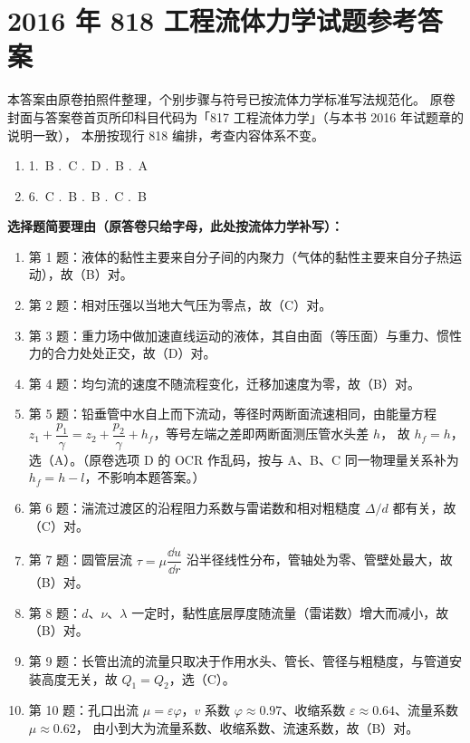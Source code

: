 \chapter{2016 年 818 工程流体力学试题参考答案}

\begin{tishi}
本答案由原卷拍照件整理，个别步骤与符号已按流体力学标准写法规范化。
原卷封面与答案卷首页所印科目代码为「817 工程流体力学」（与本书 2016 年试题章的说明一致），
本册按现行 818 编排，考查内容体系不变。
\end{tishi}


\begin{enumerate}[label={}]
  \item 1.~B .~C .~D .~B .~A
  \item 6.~C .~B .~B .~C .~B
\end{enumerate}

\begin{tishi}
\textbf{选择题简要理由（原答卷只给字母，此处按流体力学补写）：}
\begin{enumerate}
  \item 第 1 题：液体的黏性主要来自分子间的内聚力（气体的黏性主要来自分子热运动），故（B）对。
  \item 第 2 题：相对压强以当地大气压为零点，故（C）对。
  \item 第 3 题：重力场中做加速直线运动的液体，其自由面（等压面）与重力、惯性力的合力处处正交，故（D）对。
  \item 第 4 题：均匀流的速度不随流程变化，迁移加速度为零，故（B）对。
  \item 第 5 题：铅垂管中水自上而下流动，等径时两断面流速相同，由能量方程
    $z_1+\dfrac{p_1}{\gamma}=z_2+\dfrac{p_2}{\gamma}+h_f$，等号左端之差即两断面测压管水头差 $h$，
    故 $h_f=h$，选（A）。（原卷选项 D 的 OCR 作乱码，按与 A、B、C 同一物理量关系补为 $h_f=h-l$，不影响本题答案。）
  \item 第 6 题：湍流过渡区的沿程阻力系数与雷诺数和相对粗糙度 $\Delta/d$ 都有关，故（C）对。
  \item 第 7 题：圆管层流 $\tau=\mu\dfrac{\dd u}{\dd r}$ 沿半径线性分布，管轴处为零、管壁处最大，故（B）对。
  \item 第 8 题：$d$、$\nu$、$\lambda$ 一定时，黏性底层厚度随流量（雷诺数）增大而减小，故（B）对。
  \item 第 9 题：长管出流的流量只取决于作用水头、管长、管径与粗糙度，与管道安装高度无关，故 $Q_1=Q_2$，选（C）。
  \item 第 10 题：孔口出流 $\mu=\varepsilon\varphi$，$v$ 系数 $\varphi\approx0.97$、收缩系数 $\varepsilon\approx0.64$、流量系数 $\mu\approx0.62$，
    由小到大为流量系数、收缩系数、流速系数，故（B）对。
\end{enumerate}
\end{tishi}

